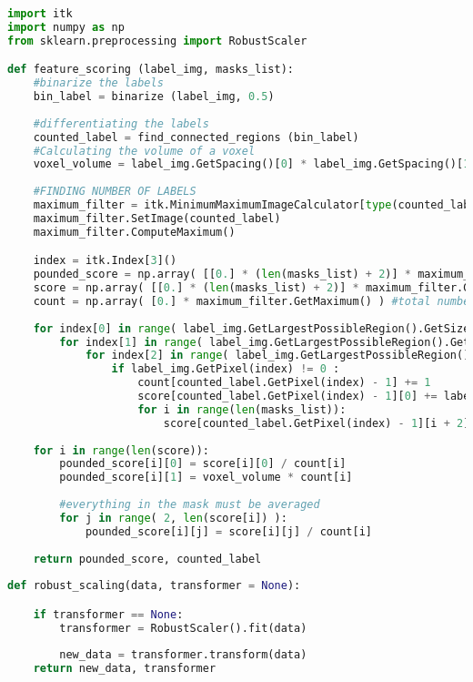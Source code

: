 \documentclass{standalone}
\begin{document}
\lstset{style=python}
	\begin{lstlisting}[language=python, caption = Feature Extracion, label=feature_extraction]
import itk
import numpy as np
from sklearn.preprocessing import RobustScaler

def feature_scoring (label_img, masks_list):
    #binarize the labels
    bin_label = binarize (label_img, 0.5)
    
    #differentiating the labels
    counted_label = find_connected_regions (bin_label)
    #Calculating the volume of a voxel
    voxel_volume = label_img.GetSpacing()[0] * label_img.GetSpacing()[1] * label_img.GetSpacing()[2] 
    
    #FINDING NUMBER OF LABELS
    maximum_filter = itk.MinimumMaximumImageCalculator[type(counted_label)].New()
    maximum_filter.SetImage(counted_label)
    maximum_filter.ComputeMaximum()

    index = itk.Index[3]()
    pounded_score = np.array( [[0.] * (len(masks_list) + 2)] * maximum_filter.GetMaximum() ) #score for lesions divided pixels per lesion
    score = np.array( [[0.] * (len(masks_list) + 2)] * maximum_filter.GetMaximum() ) #total scores for each lesion
    count = np.array( [0.] * maximum_filter.GetMaximum() ) #total number of pixels for lesion
    
    for index[0] in range( label_img.GetLargestPossibleRegion().GetSize()[0] ):
        for index[1] in range( label_img.GetLargestPossibleRegion().GetSize()[1] ):
            for index[2] in range( label_img.GetLargestPossibleRegion().GetSize()[2] ):
                if label_img.GetPixel(index) != 0 :
                    count[counted_label.GetPixel(index) - 1] += 1
                    score[counted_label.GetPixel(index) - 1][0] += label_img.GetPixel(index)
                    for i in range(len(masks_list)):
                        score[counted_label.GetPixel(index) - 1][i + 2] += masks_list[i].GetPixel(index)
              
    for i in range(len(score)):
        pounded_score[i][0] = score[i][0] / count[i]
        pounded_score[i][1] = voxel_volume * count[i]
        
        #everything in the mask must be averaged
        for j in range( 2, len(score[i]) ):
            pounded_score[i][j] = score[i][j] / count[i]
    
    return pounded_score, counted_label
    
def robust_scaling(data, transformer = None):

    if transformer == None:
        transformer = RobustScaler().fit(data)
        
        new_data = transformer.transform(data)
    return new_data, transformer
    \end{lstlisting}
\end{document}
